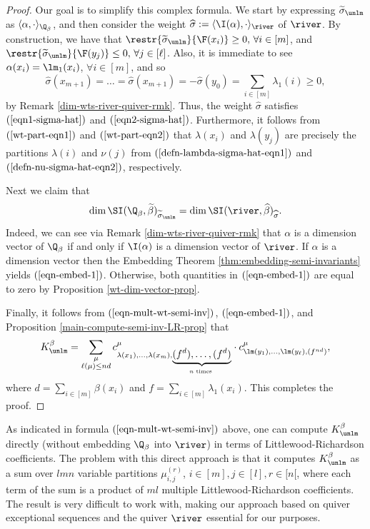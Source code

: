 \begin{proof}
Our goal is to simplify this complex formula. We start by expressing $\widetilde{\sigma}_{\unlm}$ as $\langle \alpha, \cdot \rangle_{\Q_\beta}$, and then consider the weight $\widehat{\sigma}:=\langle \I(\alpha), \cdot \rangle_{\river}$ of $\river$.  By construction, we have that $\restr{\widetilde{\sigma}_{\unlm}}{\F(x_i)} \geq 0, \, \forall i \in [m]$, and $\restr{\widetilde{\sigma}_{\unlm}}{\F(y_j)} \leq 0, \, \forall j \in [\ell]$. Also, it is immediate to see $\alpha(x_i)=\lm_1(x_i)$, $\forall i \in [m]$, and so 
$$
\widehat{\sigma}(x_{m+1})=\ldots=\widehat{\sigma}(x_{m+1}) =-\widehat{\sigma}(y_0)=\sum_{i \in [m]} \lambda_1(i) \geq 0,
$$
by Remark \ref{dim-wts-river-quiver-rmk}. Thus, the weight $\widehat{\sigma}$ satisfies $(\ref{eqn1-sigma-hat})$ and $(\ref{eqn2-sigma-hat})$. Furthermore, it follows from $(\ref{wt-part-eqn1})$ and $(\ref{wt-part-eqn2})$ that $\lambda(x_i)$ and $\lambda(y_j)$ are precisely the partitions $\lambda(i)$ and $\nu(j)$ from $(\ref{defn-lambda-sigma-hat-eqn1})$ and $(\ref{defn-nu-sigma-hat-eqn2})$, respectively.

Next we claim that
\begin{equation}\label{eqn-embed-1}
\dim \SI(\Q_\beta, \widetilde{\beta})_{\widetilde{\sigma}_{\unlm}}=\dim \SI(\river, \widehat{\beta})_{\widehat{\sigma}}.
\end{equation}
Indeed, we can see via Remark \ref{dim-wts-river-quiver-rmk} that $\alpha$ is a dimension vector of $\Q_\beta$ if and only if $\I(\alpha)$ is a dimension vector of $\river$. If $\alpha$ is a dimension vector then the Embedding Theorem \ref{thm:embedding-semi-invariants} yields $(\ref{eqn-embed-1})$.  Otherwise, both quantities in $(\ref{eqn-embed-1})$ are equal to zero by Proposition \ref{wt-dim-vector-prop}.

Finally, it follows from $(\ref{eqn-mult-wt-semi-inv})$, $(\ref{eqn-embed-1})$, and Proposition \ref{main-compute-semi-inv-LR-prop} that
$$
K^{\beta}_{\unlm} = \sum_{\substack{\mu\\ \ell(\mu)\leq nd}} c^\mu_{\lambda(x_1),\ldots, \lambda(x_m), \underbrace{(f^d),\ldots, (f^d)}_{n \text{ times }}} \cdot c^\mu_{\lm(y_1),\ldots, \lm(y_\ell),(f^{nd})},
$$
where $d=\sum_{i\in [m]} \beta(x_i)$ and $f=\sum_{i \in [m]} \lambda_1(x_i)$. This completes the proof.
\end{proof}

\begin{remark}\label{rmk-direct-compute-vs-river-quiver}
As indicated in formula $(\ref{eqn-mult-wt-semi-inv})$ above, one can compute $K^{\beta}_{\unlm}$ directly (without embedding $\Q_\beta$ into $\river$) in terms of Littlewood-Richardson coefficients. The problem with this direct approach is that it computes $K^{\beta}_{\unlm}$ as a sum over $l  m  n$ variable partitions $\mu_{i,j}^{(r)}$,  $i\in [m], j \in [l], r \in [n[$, where each term of the sum is a product of $m l$ multiple Littlewood-Richardson coefficients. The result is very difficult to work with, making our approach based on quiver exceptional sequences and the quiver $\river$ essential for our purposes. 
\end{remark}

